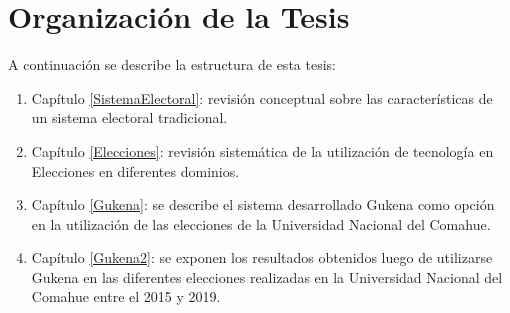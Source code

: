

\section{Organización de la Tesis}
A continuación se describe la estructura de esta tesis:
\begin{enumerate}
    \item Capítulo \ref{SistemaElectoral}: revisión conceptual sobre las características  
    de un sistema electoral tradicional.
    \item Capítulo \ref{Elecciones}: revisión sistemática de la utilización de tecnología en  Elecciones en diferentes dominios.
    \item Capítulo \ref{Gukena}: se describe el sistema desarrollado Gukena como opción en la utilización de las elecciones de la Universidad Nacional del Comahue.
    \item Capítulo \ref{Gukena2}: se exponen los resultados obtenidos luego de utilizarse Gukena en las diferentes elecciones realizadas en la Universidad Nacional del Comahue entre el 2015 y 2019.
\end{enumerate}

